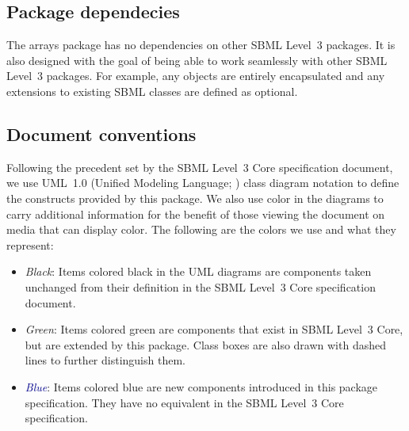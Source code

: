 
\subsection{Package dependecies}

The arrays package has no dependencies on other SBML Level~3 packages.  It is also designed with the goal of being able to work seamlessly with other SBML Level~3 packages. For example, any objects are entirely encapsulated and any extensions to existing SBML classes are defined as optional.

\subsection{Document conventions}
\label{conventions}

Following the precedent set by the SBML Level~3 Core specification
document, we use UML~1.0 (Unified Modeling Language;
\citealt{eriksson:1998,oestereich:1999}) class diagram notation to
define the constructs provided by this package.  We also use color in
the diagrams to carry additional information for the benefit of those
viewing the document on media that can display color.  The following are
the colors we use and what they represent:

\begin{itemize}

\item[\raisebox{2.75pt}{\colorbox{black}{\rule{0.8pt}{0.8pt}}}]
  \emph{Black}: Items colored black in the UML diagrams are components
  taken unchanged from their definition in the SBML Level~3 Core
  specification document.

\item[\raisebox{2.75pt}{\colorbox{mediumgreen}{\rule{0.8pt}{0.8pt}}}]
  \emph{\textcolor{mediumgreen}{Green}}: Items colored green are
  components that exist in SBML Level~3 Core, but are extended by this
  package.  Class boxes are also drawn with dashed lines to further
  distinguish them.

\item[\raisebox{2.75pt}{\colorbox{darkblue}{\rule{0.8pt}{0.8pt}}}]
  \emph{\textcolor{darkblue}{Blue}}: Items colored blue are new
  components introduced in this package specification.  They have no
  equivalent in the SBML Level~3 Core specification.

\end{itemize}

